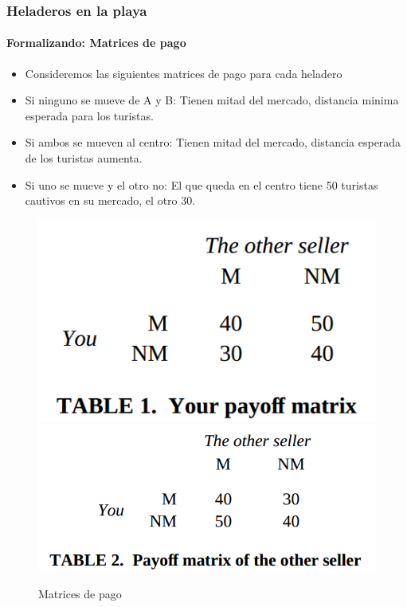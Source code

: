 \documentclass{beamer}
\begin{document}
\begin{frame}
  \frametitle{Heladeros en la playa}
  \framesubtitle{Formalizando: Matrices de pago}
  \begin{itemize}
    \setlength{\itemsep}{4pt}
    \item Consideremos las siguientes matrices de pago para cada heladero
    \pause
    \item Si ninguno se mueve de A y B: Tienen mitad del mercado, distancia minima esperada para los turistas.   
    \pause
    \item Si ambos se mueven al centro: Tienen mitad del mercado, distancia esperada de los turistas aumenta.
    \pause
    \item Si uno se mueve y el otro no: El que queda en el centro tiene 50 turistas cautivos en su mercado, el otro 30.
    \pause    
  \end{itemize}

  \begin{figure}[h!]
      \centering        
      \includegraphics[scale=0.25]{fig/you-matrices-pago-playa.png}
      \includegraphics[scale=0.25]{fig/elotro-matrices-pago-playa.png}
      \caption{Matrices de pago}
  \end{figure}
\end{frame}
\end{document}
